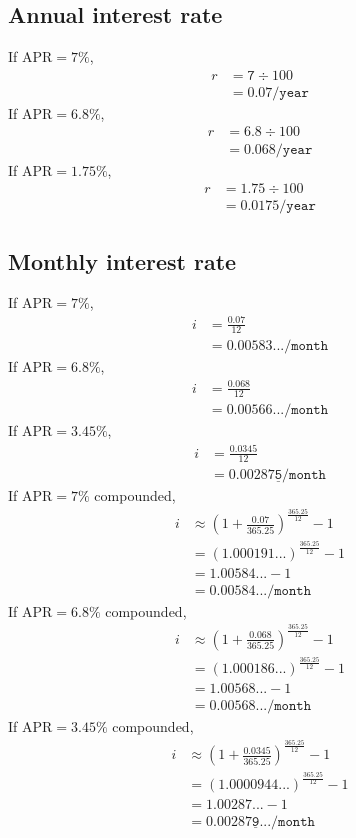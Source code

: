 \documentclass[12pt,letterpaper,oneside]{article}
\theoremstyle{remark} %
\begin{document}
	\subsection{Annual interest rate}
	If $\mbox{APR}=7\%$,
	\begin{align*}
	r&=\mathtt{7}\div 100\\
	&=\mathtt{0.07/year}
	\end{align*}
	If $\mbox{APR}=6.8\%$,
	\begin{align*}
	r&=\mathtt{6.8}\div 100\\
	&=\mathtt{0.068/year}
	\end{align*}
	If $\mbox{APR}=1.75\%$,
	\begin{align*}
	r&=\mathtt{1.75}\div 100\\
	&=\mathtt{0.0175/year}
	\end{align*}

	\subsection{Monthly interest rate}
	If $\mbox{APR}=7\%$,
	\begin{align*}
	i&=\frac{\mathtt{0.07}}{12}\\
	&=\mathtt{0.00583.../month}
	\end{align*}
	If $\mbox{APR}=6.8\%$,
	\begin{align*}
	i&=\frac{\mathtt{0.068}}{12}\\
	&=\mathtt{0.00566.../month}
	\end{align*}
	If $\mbox{APR}=3.45\%$,
	\begin{align*}
	i&=\frac{\mathtt{0.0345}}{12}\\
	&=\mathtt{0.00287\underline{5}/month}
	\end{align*}
	\newpage
	\setlength\parindent{0pt} If $\mbox{APR}=7\%$ compounded,
	\begin{align*}
	i&\approx\left(1+\frac{\mathtt{0.07}}{365.25}\right)^{\frac{365.25}{12}}-1\\
	&=\left(\mathtt{1.000191...}\right)^{\frac{365.25}{12}}-1\\
	&=\mathtt{1.00584...}-1\\
	&=\mathtt{0.00584.../month}
	\end{align*}
	If $\mbox{APR}=6.8\%$ compounded,
	\begin{align*}
	i&\approx\left(1+\frac{\mathtt{0.068}}{365.25}\right)^{\frac{365.25}{12}}-1\\
	&=\left(\mathtt{1.000186...}\right)^{\frac{365.25}{12}}-1\\
	&=\mathtt{1.00568...}-1\\
	&=\mathtt{0.00568.../month}
	\end{align*}
	If $\mbox{APR}=3.45\%$ compounded,
	\begin{align*}
	i&\approx\left(1+\frac{\mathtt{0.0345}}{365.25}\right)^{\frac{365.25}{12}}-1\\
	&=\left(\mathtt{1.0000944...}\right)^{\frac{365.25}{12}}-1\\
	&=\mathtt{1.00287...}-1\\
	&=\mathtt{0.00287\underline{9}.../month}
	\end{align*}
\end{document}
